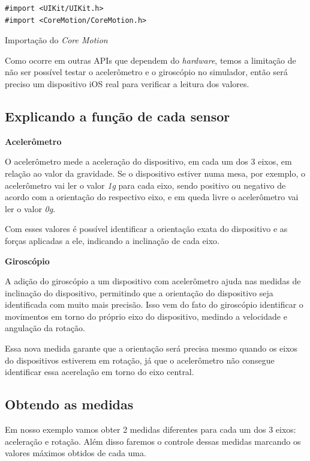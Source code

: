 \documentclass[a4paper,12pt,brazil,oneside]{book}
\begin{document}
\begin{listing}[H]
\begin{verbatim}
#import <UIKit/UIKit.h>
#import <CoreMotion/CoreMotion.h>
\end{verbatim}
\caption{Importação do \emph{Core Motion}}
\end{listing}


Como ocorre em outras APIs que dependem do \emph{hardware}, temos a limitação de não ser possível testar o acelerômetro e o giroscópio no simulador, então será preciso um dispositivo iOS real para verificar a leitura dos valores.

\subsection{Explicando a função de cada sensor}


\textbf{Acelerômetro}


O acelerômetro mede a aceleração do dispositivo, em cada um dos 3 eixos, em relação ao valor da gravidade. Se o dispositivo estiver numa mesa, por exemplo, o acelerômetro vai ler o valor \emph{1g} para cada eixo, sendo positivo ou negativo de acordo com a orientação do respectivo eixo, e em queda livre o acelerômetro vai ler o valor \emph{0g}.

Com esses valores é possível identificar a orientação exata do dispositivo e as forças aplicadas a ele, indicando a inclinação de cada eixo.	

\textbf{Giroscópio}

A adição do giroscópio a um dispositivo com acelerômetro ajuda nas medidas de inclinação do dispositivo, permitindo que a orientação do dispositivo seja identificada com muito mais precisão. Isso vem do fato do giroscópio identificar o movimentos em torno do próprio eixo do dispositivo, medindo a velocidade e angulação da rotação.

Essa nova medida garante que a orientação será precisa mesmo quando os eixos do dispositivos estiverem em rotação, já que o acelerômetro não consegue identificar essa acerelação em torno do eixo central.

\subsection{Obtendo as medidas}

Em nosso exemplo vamos obter 2 medidas diferentes para cada um dos 3 eixos: aceleração e rotação. Além disso faremos o controle dessas medidas marcando os valores máximos obtidos de cada uma.
\end{document}
